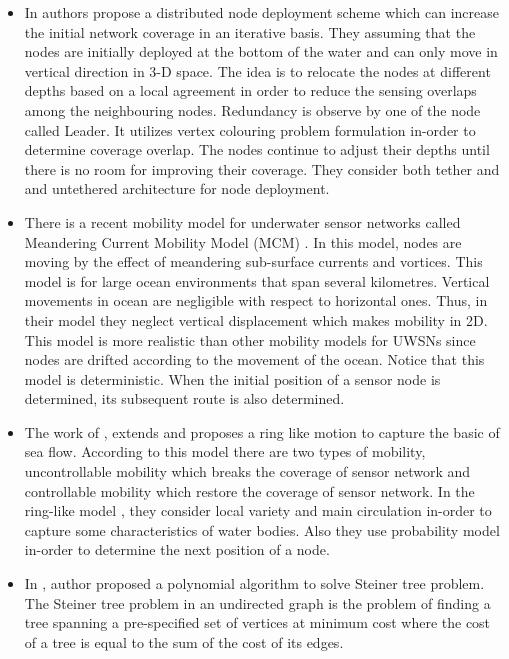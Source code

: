 \documentclass[12pt]{article}
\begin{document}
 
 \begin{itemize}
 \item In \cite{akkaya2009self} authors propose a distributed node deployment scheme which can increase the initial network coverage in an iterative basis. They assuming that the nodes are initially deployed at the bottom of the water and can only move in vertical direction in 3-D space. The idea is to relocate the nodes at different depths based on a local agreement in order to reduce the sensing overlaps among the neighbouring nodes. Redundancy is observe by one  of the node called Leader. It utilizes vertex colouring problem formulation in-order to determine coverage overlap. The nodes continue to adjust their depths until there is no room for improving their coverage. They consider both tether and and untethered architecture for node deployment.
 \item There is a recent mobility model for underwater sensor networks called Meandering Current Mobility Model (MCM) \cite{caruso2008meandering}. In this model, nodes are moving by the effect of meandering sub-surface currents and vortices. This model is for large ocean environments that span several kilometres. Vertical movements in ocean are negligible with respect to horizontal ones. Thus, in their model they neglect vertical displacement which makes mobility in 2D. This model is more realistic than other mobility models for UWSNs since nodes are drifted according to the movement of the ocean.  Notice that this model is deterministic. When the initial position of a sensor node is determined, its
subsequent route is also determined.
\item The work of \cite{luo2009double}, \cite{luo2012double} extends \cite{caruso2008meandering} and proposes a ring like motion to capture the basic of sea flow. According to this model there are two types of mobility, uncontrollable mobility which breaks the coverage of sensor network and controllable mobility which restore the coverage of sensor network. In the ring-like model \cite{luo2009double}, they consider local variety and main circulation in-order to capture some characteristics of water bodies. Also they use probability model in-order to determine the next position of a node.

\item In \cite{wald1983steiner}, \cite{wald1983steiner1} author proposed a polynomial algorithm to solve Steiner tree problem. The Steiner tree problem  in an undirected graph is the problem of finding 
a tree spanning a pre-specified set of vertices at minimum cost where the cost of a tree is 
equal to the sum of the cost of its edges.
 \end{itemize}
 
\end{document}
